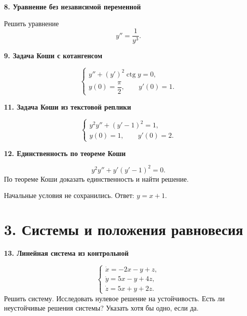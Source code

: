 \documentclass[11pt,a4paper]{article}
\newcommand{\sect}[1]{\Needspace{85mm}\section*{\color{accent}#1}}
\newcommand{\task}[2]{\par\vspace{6pt}
 {\bfseries\color{accent}#1. #2}\par}
\newcommand{\note}[1]{\par{\small\color{muted}#1}\par}
\begin{document}
\begin{minipage}[t]{\linewidth}
\task{8}{Уравнение без независимой переменной}
Решить уравнение
\[
 y''=\frac{1}{y^3}.
\]
\end{minipage}\par\vspace{6pt}

\begin{minipage}[t]{\linewidth}
\task{9}{Задача Коши с котангенсом}
\[
 \begin{cases}
 y''+(y')^2\operatorname{ctg}y=0,\\
 y(0)=\dfrac{\pi}{2},\qquad y'(0)=1.
 \end{cases}
\]
\end{minipage}\par\vspace{6pt}

\begin{minipage}[t]{\linewidth}
\task{11}{Задача Коши из текстовой реплики}
\[
 \begin{cases}
 y^2y''+(y'-1)^2=1,\\
 y(0)=1,\qquad y'(0)=2.
 \end{cases}
\]
\end{minipage}\par\vspace{6pt}

\begin{minipage}[t]{\linewidth}
\task{12}{Единственность по теореме Коши}
\[
 y^2y''+y'(y'-1)^2=0.
\]
По теореме Коши доказать единственность и найти решение.
\note{Начальные условия не сохранились. Ответ: $y=x+1$.}
\end{minipage}\par\vspace{6pt}

\sect{3. Системы и положения равновесия}

\begin{minipage}[t]{\linewidth}
\task{13}{Линейная система из контрольной}
\[
 \begin{cases}
 \dot x=-2x-y+z,\\
 \dot y=5x-y+4z,\\
 \dot z=5x+y+2z.
 \end{cases}
\]
Решить систему. Исследовать нулевое решение на устойчивость.
Есть ли неустойчивые решения системы? Указать хотя бы одно, если да.
\end{minipage}\par\vspace{6pt}
\end{document}
